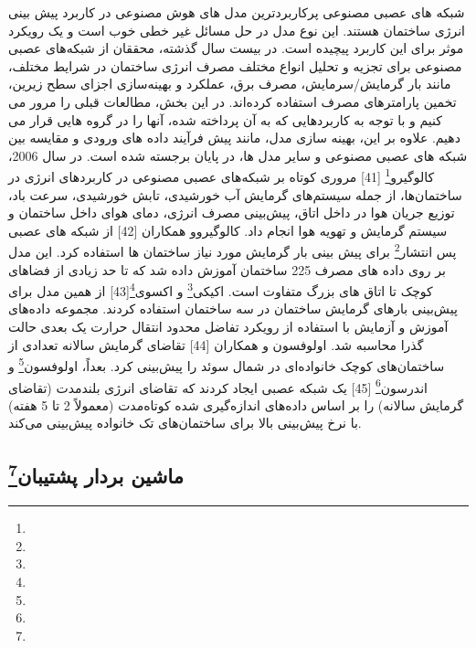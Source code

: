 شبکه های عصبی مصنوعی پرکاربردترین مدل های هوش مصنوعی در کاربرد پیش بینی انرژی ساختمان هستند. این نوع مدل در حل مسائل غیر خطی خوب است و یک رویکرد موثر برای این کاربرد پیچیده است. در بیست سال گذشته، محققان از شبکه‌های عصبی مصنوعی برای تجزیه و تحلیل انواع مختلف مصرف انرژی ساختمان در شرایط مختلف، مانند بار گرمایش/سرمایش، مصرف برق، عملکرد و بهینه‌سازی اجزای سطح زیرین، تخمین پارامترهای مصرف استفاده کرده‌اند. در این بخش، مطالعات قبلی را مرور می کنیم و با توجه به کاربردهایی که به آن پرداخته شده، آنها را در گروه هایی قرار می دهیم. علاوه بر این، بهینه سازی مدل، مانند پیش فرآیند داده های ورودی و مقایسه بین شبکه های عصبی مصنوعی و سایر مدل ها، در پایان برجسته شده است. در سال 2006، کالوگیرو\footnote{} [41] مروری کوتاه بر شبکه‌های عصبی مصنوعی در کاربردهای انرژی در ساختمان‌ها، از جمله سیستم‌های گرمایش آب خورشیدی، تابش خورشیدی، سرعت باد، توزیع جریان هوا در داخل اتاق، پیش‌بینی مصرف انرژی، دمای هوای داخل ساختمان و سیستم گرمایش و تهویه هوا انجام داد.
کالوگیرو\footnotemark[18] و همکاران [42] از شبکه های عصبی پس انتشار\footnote{} برای پیش بینی بار گرمایش مورد نیاز ساختمان ها استفاده کرد. این مدل بر روی داده های مصرف 225 ساختمان آموزش داده شد که تا حد زیادی از فضاهای کوچک تا اتاق های بزرگ متفاوت است. اکیکی\footnote{} و اکسوی\footnote{}[43] از همین مدل برای پیش‌بینی بارهای گرمایش ساختمان در سه ساختمان استفاده کردند. مجموعه داده‌های آموزش و آزمایش با استفاده از رویکرد تفاضل محدود انتقال حرارت یک بعدی حالت گذرا محاسبه شد. اولوفسون و همکاران [44] تقاضای گرمایش سالانه تعدادی از ساختمان‌های کوچک خانواده‌ای در شمال سوئد را پیش‌بینی کرد. بعداً، اولوفسون\footnote{} و اندرسون\footnote{} [45] یک شبکه عصبی ایجاد کردند که تقاضای انرژی بلندمدت (تقاضای گرمایش سالانه) را بر اساس داده‌های اندازه‌گیری شده کوتاه‌مدت (معمولاً 2 تا 5 هفته) با نرخ پیش‌بینی بالا برای ساختمان‌های تک خانواده پیش‌بینی می‌کند.


\subsection{ماشین بردار پشتیبان\footnote{}}

